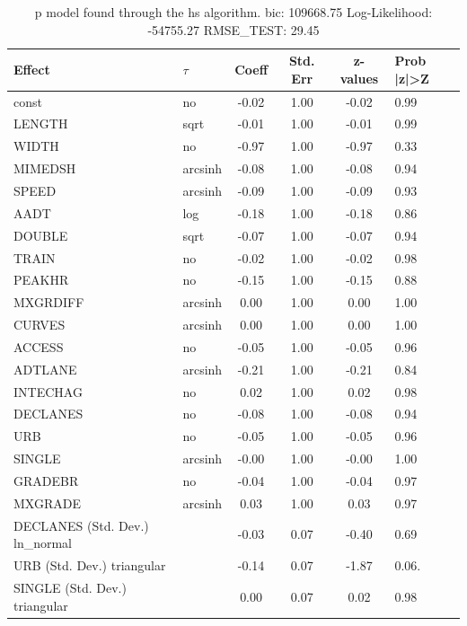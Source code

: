 \begin{table}
	\caption{p model found through the hs algorithm. bic: 109668.75 Log-Likelihood: -54755.27 RMSE_TEST: 29.45}
	\begin{center}
		\begin{tabular}{|l|l|c|c|c|l|}
			\hline
			Effect & $\tau$ & Coeff & Std. Err & z-values & Prob |z|>Z \\
			\hline
			const & no & -0.02 & 1.00 & -0.02 & 0.99 \\
			\hline
			LENGTH & sqrt & -0.01 & 1.00 & -0.01 & 0.99 \\
			\hline
			WIDTH & no & -0.97 & 1.00 & -0.97 & 0.33 \\
			\hline
			MIMEDSH & arcsinh & -0.08 & 1.00 & -0.08 & 0.94 \\
			\hline
			SPEED & arcsinh & -0.09 & 1.00 & -0.09 & 0.93 \\
			\hline
			AADT & log & -0.18 & 1.00 & -0.18 & 0.86 \\
			\hline
			DOUBLE & sqrt & -0.07 & 1.00 & -0.07 & 0.94 \\
			\hline
			TRAIN & no & -0.02 & 1.00 & -0.02 & 0.98 \\
			\hline
			PEAKHR & no & -0.15 & 1.00 & -0.15 & 0.88 \\
			\hline
			MXGRDIFF & arcsinh & 0.00 & 1.00 & 0.00 & 1.00 \\
			\hline
			CURVES & arcsinh & 0.00 & 1.00 & 0.00 & 1.00 \\
			\hline
			ACCESS & no & -0.05 & 1.00 & -0.05 & 0.96 \\
			\hline
			ADTLANE & arcsinh & -0.21 & 1.00 & -0.21 & 0.84 \\
			\hline
			INTECHAG & no & 0.02 & 1.00 & 0.02 & 0.98 \\
			\hline
			DECLANES & no & -0.08 & 1.00 & -0.08 & 0.94 \\
			\hline
			URB & no & -0.05 & 1.00 & -0.05 & 0.96 \\
			\hline
			SINGLE & arcsinh & -0.00 & 1.00 & -0.00 & 1.00 \\
			\hline
			GRADEBR & no & -0.04 & 1.00 & -0.04 & 0.97 \\
			\hline
			MXGRADE & arcsinh & 0.03 & 1.00 & 0.03 & 0.97 \\
			\hline
			DECLANES (Std. Dev.) ln_normal &  & -0.03 & 0.07 & -0.40 & 0.69 \\
			\hline
			URB (Std. Dev.) triangular &  & -0.14 & 0.07 & -1.87 & 0.06. \\
			\hline
			SINGLE (Std. Dev.) triangular &  & 0.00 & 0.07 & 0.02 & 0.98 \\

\end{tabular}
\end{center}
\end{table}
